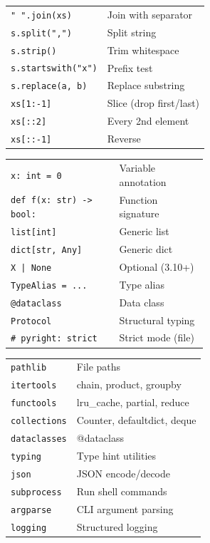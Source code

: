 \documentclass[10pt]{extarticle}
\begin{document}
\begin{multicols}{2}
\begin{tabularx}{\linewidth}{@{}l@{\enspace}Y@{}}
\texttt{" ".join(xs)}                & Join with separator \\
\texttt{s.split(",")  }             & Split string \\
\texttt{s.strip()}                   & Trim whitespace \\
\texttt{s.startswith("x")}          & Prefix test \\
\texttt{s.replace(a, b)}            & Replace substring \\
\texttt{xs[1:-1]}                    & Slice (drop first/last) \\
\texttt{xs[::2]}                     & Every 2nd element \\
\texttt{xs[::-1]}                    & Reverse \\
\end{tabularx}

\begin{tabularx}{\linewidth}{@{}>{\raggedright\arraybackslash}p{0.55\linewidth}@{\enspace}Y@{}}
\texttt{x: int = 0}               & Variable annotation \\
\texttt{def f(x: str) -> bool:}   & Function signature \\
\texttt{list[int]}                 & Generic list \\
\texttt{dict[str, Any]}           & Generic dict \\
\texttt{X | None}                  & Optional (3.10+) \\
\texttt{TypeAlias = ...}           & Type alias \\
\texttt{@dataclass}                & Data class \\
\texttt{Protocol}                  & Structural typing \\
\texttt{\# pyright: strict}        & Strict mode (file) \\
\end{tabularx}

\begin{tabularx}{\linewidth}{@{}l@{\enspace}Y@{}}
\texttt{pathlib}          & File paths \\
\texttt{itertools}        & chain, product, groupby \\
\texttt{functools}        & lru\_cache, partial, reduce \\
\texttt{collections}      & Counter, defaultdict, deque \\
\texttt{dataclasses}      & @dataclass \\
\texttt{typing}           & Type hint utilities \\
\texttt{json}             & JSON encode/decode \\
\texttt{subprocess}       & Run shell commands \\
\texttt{argparse}         & CLI argument parsing \\
\texttt{logging}          & Structured logging \\
\end{tabularx}


\end{multicols}
\end{document}
